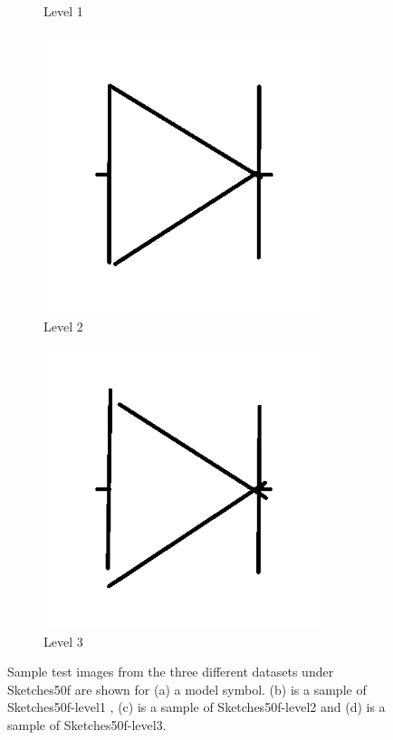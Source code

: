 \begin{figure}[h]
\begin{subfigure}[b]{0.25\textwidth}
                \caption{Level 1}
        \end{subfigure}
                \begin{subfigure}[b]{0.25\textwidth}
                \centering
                \includegraphics[width=0.9\textwidth]{figures/Results/Sketches50f/level2.png}
                \caption{Level 2}
        \end{subfigure}
                \begin{subfigure}[b]{0.25\textwidth}
                \centering
                \includegraphics[width=0.9\textwidth]{figures/Results/Sketches50f/level3.png}
                \caption{Level 3}
        \end{subfigure}
        \caption[Sample data from 'Sketches50f' dataset]{Sample test images from the three different datasets under Sketches50f are shown for (a) a model symbol. (b) is a sample of Sketches50f-level1 , (c)  is a sample of Sketches50f-level2 and (d) is a sample of Sketches50f-level3.}
        \label{fig:Sketches50fExamples}
\end{figure}

